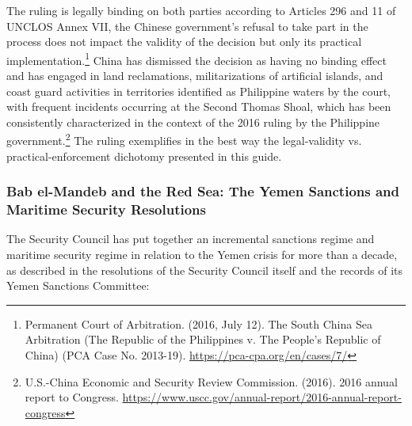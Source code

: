 The ruling is legally binding on both parties according to Articles 296 and 11 of UNCLOS Annex VII, the Chinese government’s refusal to take part in the process does not impact the validity of the decision but only its practical implementation.\footnote{Permanent Court of Arbitration. (2016, July 12). The South China Sea Arbitration (The Republic of the Philippines v. The People's Republic of China) (PCA Case No. 2013-19). \url{https://pca-cpa.org/en/cases/7/}} China has dismissed the decision as having no binding effect and has engaged in land reclamations, militarizations of artificial islands, and coast guard activities in territories identified as Philippine waters by the court, with frequent incidents occurring at the Second Thomas Shoal, which has been consistently characterized in the context of the 2016 ruling by the Philippine government.\footnote{U.S.-China Economic and Security Review Commission. (2016). 2016 annual report to Congress. \url{https://www.uscc.gov/annual-report/2016-annual-report-congress}} The ruling exemplifies in the best way the legal-validity vs. practical-enforcement dichotomy presented in this guide.

\subsubsection{Bab el-Mandeb and the Red Sea: The Yemen Sanctions and Maritime Security Resolutions}

The Security Council has put together an incremental sanctions regime and maritime security regime in relation to the Yemen crisis for more than a decade, as described in the resolutions of the Security Council itself and the records of its Yemen Sanctions Committee:

